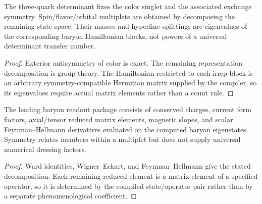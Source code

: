 \documentclass[12pt,a4paper]{article}
\begin{document}
\begin{theorem}
\label{p11:thm:three-quark-determinant-geometry-baryon-multiplets}

The three-quark determinant fixes the color singlet and the associated exchange symmetry.  Spin/flavor/orbital multiplets are obtained by decomposing the remaining state space.  Their masses and hyperfine splittings are eigenvalues of the corresponding baryon Hamiltonian blocks, not powers of a universal determinant transfer number.
\label{p11:eq:determinant-color-weight-cb}
\label{p11:eq:baryon-relative-exponent-spectrum}
\label{p11:eq:baryon-su6-ground-decomp}
\end{theorem}
\begin{proof}

Exterior antisymmetry of color is exact.  The remaining representation decomposition is group theory.  The Hamiltonian restricted to each irrep block is an arbitrary symmetry-compatible Hermitian matrix supplied by the compiler, so its eigenvalues require actual matrix elements rather than a count rule.
\end{proof}

\begin{corollary}
\label{p11:cor:leading-baryon-current-scalar-response-package}

The leading baryon readout package consists of conserved charges, current form factors, axial/tensor reduced matrix elements, magnetic slopes, and scalar Feynman--Hellmann derivatives evaluated on the computed baryon eigenstates.  Symmetry relates members within a multiplet but does not supply universal numerical dressing factors.
\label{p11:eq:baryon-current-package-numbers}
\label{p11:eq:fd-leading-baryon-package}
\end{corollary}
\begin{proof}

Ward identities, Wigner--Eckart, and Feynman--Hellmann give the stated decomposition.  Each remaining reduced element is a matrix element of a specified operator, so it is determined by the compiled state/operator pair rather than by a separate phenomenological coefficient.
\end{proof}
\end{document}
